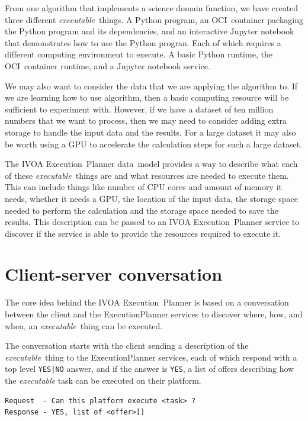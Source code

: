 \documentclass[11pt,a4paper]{ivoa}
\newcommand{\datamodel} {data~model}
\newcommand{\ivoa} {IVOA}
\newcommand{\execplanner} {ExecutionPlanner}
\newcommand{\executionplanner} {Execution~Planner}
\newcommand{\jupyternotebook} {Jupyter notebook}
\newcommand{\python} {Python}
\newcommand{\ocicontainer} {OCI~container}
\newcommand{\codeword}[1] {\texttt{#1}}
\newcommand{\dataset} {dataset}
\newcommand{\executablething} {\textit{executable}~thing}
\newcommand{\excutabletask} {\textit{executable} task}
\newcommand{\cpu} {CPU}
\newcommand{\gpu} {GPU}
\begin{document}
From one algorithm that implements a science domain function, we have created three different \executablething{}s.
A \python{} program, an \ocicontainer{} packaging the \python{} program and its dependencies, and an interactive \jupyternotebook{}
that demonstrates how to use the \python{} progran.
Each of which requires a different computing environment to execute.
A basic \python{} runtime, the \ocicontainer{} runtime, and a \jupyternotebook{} service.

We may also want to consider the data that we are applying the algorithm to.
If we are learning how to use algorithm, then a basic computing resource will be sufficient
to experiment with.
However, if we have a \dataset{} of ten million numbers that we want to process, then we may
need to consider adding extra storage to handle the input data and the results.
For a large \dataset{} it may also be worth using a \gpu{} to accelerate the calculation steps
for such a large \dataset{}.

The \ivoa{} \executionplanner{} \datamodel{} provides a way to describe what each of these \executablething{}s
are and what resources are needed to execute them.
This can include things like number of \cpu{} cores and amount of memory it needs,
whether it needs a \gpu{}, the location of the input data, the storage space needed to perform
the calculation and the storage space needed to save the results.
This description can be passed to an \ivoa{} \executionplanner{} service to
discover if the service is able to provide the resources required to execute it.

\section{Client-server conversation}
\label{conversation}

The core idea behind the \ivoa{} \executionplanner{} is based on a conversation between the client
and the \execplanner{} services to discover where, how, and when, an \executablething{} can be
executed.

The conversation starts with the client sending a description of the \executablething{} to the
\execplanner{} services, each of which respond with a top level \codeword{YES|NO} answer, and if
the answer is \codeword{YES}, a list of offers describing how the \excutabletask{}
can be executed on their platform.

\begin{lstlisting}[]
Request  - Can this platform execute <task> ?
Response - YES, list of <offer>[]
\end{lstlisting}
\end{document}

